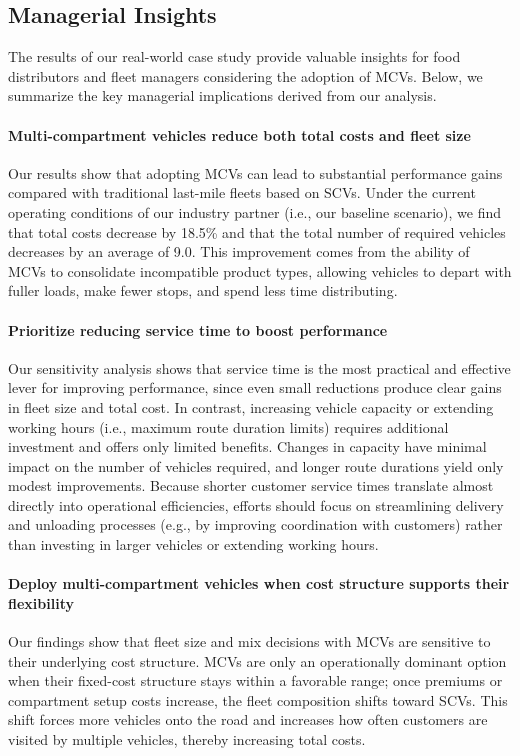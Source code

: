 \documentclass[11pt]{elsarticle}
\theoremstyle{plain}
\begin{document}
\subsection{Managerial Insights} \label{sec:discussion}

The results of our real-world case study provide valuable insights for food distributors and fleet managers considering the adoption of \acp{MCV}. Below, we summarize the key managerial implications derived from our analysis.

\paragraph{Multi-compartment vehicles reduce both total costs and fleet size}
Our results show that adopting \acp{MCV} can lead to substantial performance gains compared with traditional last-mile fleets based on \acp{SCV}. Under the current operating conditions of our industry partner (i.e., our baseline scenario), we find that total costs decrease by 18.5\% and that the total number of required vehicles decreases by an average of 9.0. This improvement comes from the ability of \acp{MCV} to consolidate incompatible product types, allowing vehicles to depart with fuller loads, make fewer stops, and spend less time distributing.

\paragraph{Prioritize reducing service time to boost performance}
Our sensitivity analysis shows that service time is the most practical and effective lever for improving performance, since even small reductions produce clear gains in fleet size and total cost. In contrast, increasing vehicle capacity or extending working hours (i.e., maximum route duration limits) requires additional investment and offers only limited benefits. Changes in capacity have minimal impact on the number of vehicles required, and longer route durations yield only modest improvements. Because shorter customer service times translate almost directly into operational efficiencies, efforts should focus on streamlining delivery and unloading processes (e.g., by improving coordination with customers) rather than investing in larger vehicles or extending working hours.

\paragraph{Deploy multi-compartment vehicles when cost structure supports their flexibility}
Our findings show that fleet size and mix decisions with \acp{MCV} are sensitive to their underlying cost structure. \acp{MCV} are only an operationally dominant option when their fixed-cost structure stays within a favorable range; once premiums or compartment setup costs increase, the fleet composition shifts toward \acp{SCV}. This shift forces more vehicles onto the road and increases how often customers are visited by multiple vehicles, thereby increasing total costs.
\end{document}
